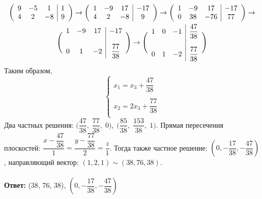 		\begin{gather*}
			\bigg( \begin{array}{c c c | c}
			9 & -5 & 1 & 1\\
			4 & 2 & -8 & 9\\
			\end{array} \bigg) 
			\to 
			\bigg(\begin{array}{c c c | c}
			1 & -9 & 17 & -17\\
			4 & 2 & -8 & 9\\
			\end{array} \bigg) 
			\to 
			\bigg(\begin{array}{c c c | c}
			1 & -9 & 17 & -17\\
			0 & 38 & -76 & 77\\
			\end{array}\bigg) 
			\to
			\\
			\Bigg(
			\begin{array}{c c c | c}
			1 & -9 & 17 & -17\\
			\; & \; & \; & \;\\
			0 & 1 & -2 & \dfrac{77}{38}\\
			\end{array}\Bigg)
			\to
			\Bigg( \begin{array}{c c c | c}
			1 & 0 & -1 & \dfrac{47}{38}\\
			\; & \; & \; & \;\\
			0 & 1 & -2 & \dfrac{77}{38}\\
			\end{array} \Bigg)
		\end{gather*}
		Таким образом, 
		\begin{equation*}
			\begin{cases}
				x_{1} = x_{3} + \dfrac{47}{38}\\
				\\
				x_{2} = 2x_{3} + \dfrac{77}{38}\\
			\end{cases}
		\end{equation*}
		Два частных решения: $\Big(\dfrac{47}{38}, \; \dfrac{77}{38}, \; 0\Big), \; \Big(\dfrac{85}{38}, \; \dfrac{153}{38}, \; 1\Big)$. Прямая пересечения плоскостей: $\dfrac{x - \dfrac{47}{38}}{1} = \dfrac{y - \dfrac{77}{38}}{2} = \dfrac{z}{1}$. Тогда также частное решение: $(0, -\dfrac{17}{38}, -\dfrac{47}{38})$, направляющий вектор: $(1, 2, 1) \sim (38, 76, 38)$.\\
		\\
		\textbf{Ответ:} (38, 76, 38), $(0, -\dfrac{17}{38}, -\dfrac{47}{38})$
		

